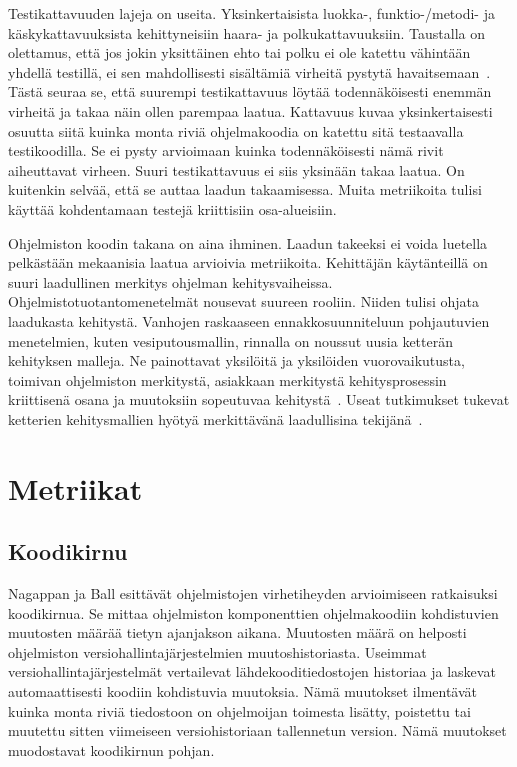 \documentclass[finnish]{../tktltiki2}
\theoremstyle{definition}
\theoremstyle{remark}
\begin{document}
    Testikattavuuden lajeja on useita. Yksinkertaisista luokka-, funktio-/metodi- ja käskykattavuuksista kehittyneisiin 
haara- ja polkukattavuuksiin. Taustalla on olettamus, että jos jokin yksittäinen ehto tai polku ei ole katettu vähintään 
yhdellä testillä, ei sen mahdollisesti sisältämiä virheitä pystytä havaitsemaan~\cite{MND09}. Tästä seuraa se, että 
suurempi testikattavuus löytää todennäköisesti enemmän virheitä ja takaa näin ollen parempaa laatua. Kattavuus kuvaa
yksinkertaisesti osuutta siitä kuinka monta riviä ohjelmakoodia on katettu sitä testaavalla testikoodilla. Se ei pysty 
arvioimaan kuinka todennäköisesti nämä rivit aiheuttavat virheen. Suuri testikattavuus ei siis yksinään takaa laatua. On 
kuitenkin selvää, että se auttaa laadun takaamisessa. Muita metriikoita tulisi käyttää kohdentamaan testejä kriittisiin 
osa-alueisiin.

    Ohjelmiston koodin takana on aina ihminen.  Laadun takeeksi ei voida luetella pelkästään mekaanisia laatua arvioivia 
metriikoita. Kehittäjän käytänteillä on suuri laadullinen merkitys ohjelman kehitysvaiheissa. 
Ohjelmistotuotantomenetelmät nousevat suureen rooliin. Niiden tulisi ohjata laadukasta kehitystä. Vanhojen raskaaseen 
ennakkosuunniteluun pohjautuvien menetelmien, kuten vesiputousmallin, rinnalla on noussut uusia ketterän kehityksen 
malleja. Ne painottavat yksilöitä ja yksilöiden vuorovaikutusta, toimivan ohjelmiston merkitystä, asiakkaan merkitystä 
kehitysprosessin kriittisenä osana ja muutoksiin sopeutuvaa kehitystä~\cite{BBB00}. Useat tutkimukset tukevat ketterien 
kehitysmallien hyötyä merkittävänä laadullisina tekijänä~\cite{SS10}. 

\section{Metriikat}

\subsection{Koodikirnu}

Nagappan ja Ball esittävät ohjelmistojen virhetiheyden arvioimiseen ratkaisuksi koodikirnua. Se mittaa ohjelmiston 
komponenttien ohjelmakoodiin kohdistuvien muutosten määrää tietyn ajanjakson aikana. Muutosten määrä on helposti 
ohjelmiston versiohallintajärjestelmien muutoshistoriasta. Useimmat versiohallintajärjestelmät vertailevat 
lähdekooditiedostojen historiaa ja laskevat automaattisesti koodiin kohdistuvia muutoksia. Nämä muutokset ilmentävät 
kuinka monta riviä tiedostoon on ohjelmoijan toimesta lisätty, poistettu tai muutettu sitten viimeiseen versiohistoriaan 
tallennetun version. Nämä muutokset muodostavat koodikirnun pohjan.
\end{document}
